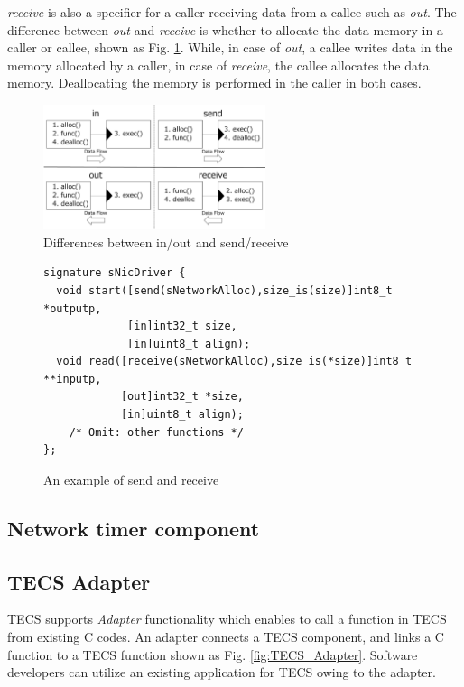 \documentclass[conference]{IEEEtran/IEEEtran}
\begin{document}
{\it receive} is also a specifier for a caller receiving data from a callee such as {\it out}.
The difference between {\it out} and {\it receive} is whether to allocate the data memory in a caller or callee, shown as Fig. \ref{fig:SendReceive}.
While, in case of {\it out}, a callee writes data in the memory allocated by a caller, in case of {\it receive}, the callee allocates the data memory.
Deallocating the memory is performed in the caller in both cases.

\begin{figure}[t]
    \centering
    \includegraphics[width=6.5cm,clip]{figure/SendReceive.pdf}
    \caption{Differences between in/out and send/receive}
    \label{fig:SendReceive}
\end{figure}

\begin{figure}[t]
\centering
\begin{lstlisting}
signature sNicDriver {
  void start([send(sNetworkAlloc),size_is(size)]int8_t *outputp,
             [in]int32_t size,
             [in]uint8_t align);
  void read([receive(sNetworkAlloc),size_is(*size)]int8_t **inputp,
            [out]int32_t *size,
            [in]uint8_t align);
    /* Omit: other functions */
};
\end{lstlisting}
\caption{An example of send and receive}
\label{src:SendReceive}
\end{figure}

\subsection{Network timer component}


\subsection{TECS Adapter}

TECS supports {\it Adapter} functionality which enables to call a function in TECS from existing C codes.
An adapter connects a TECS component, and links a C function to a TECS function shown as Fig. \ref{fig:TECS_Adapter}.
Software developers can utilize an existing application for TECS owing to the adapter.
\end{document}
